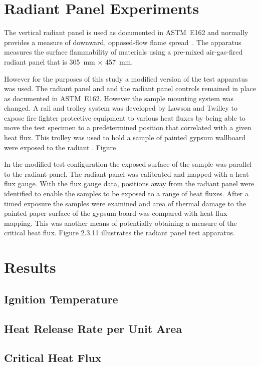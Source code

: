 \documentclass[twoside]{uocthesis}
\begin{document}
{{\section{Radiant Panel Experiments}

The vertical radiant panel is used as documented in ASTM~E162 and normally provides a measure of downward, opposed-flow flame spread~\cite{ASTM_E162}.  The apparatus measures the surface flammability of materials using a pre-mixed air-gas-fired radiant panel that is 305~mm × 457~mm.

However for the purposes of this study a modified version of the test apparatus was used.  The radiant panel and and the radiant panel controls remained in place as documented in ASTM~E162. However the sample mounting system was changed. A rail and trolley system was developed by Lawson and Twilley to expose fire fighter protective equipment to various heat fluxes by being able to move the test specimen to a predetermined position that correlated with a given heat flux.  This trolley was used to hold a sample of painted gypsum wallboard were exposed to the radiant .   Figure

In the modified test configuration the exposed surface of the sample was parallel to the radiant panel. The radiant panel was calibrated and mapped with a heat flux gauge. With the flux gauge data, positions away from the radiant panel were identified to enable the samples to be exposed to a range of heat fluxes.  After a timed exposure the samples were examined and area of thermal damage to the painted paper surface of the gypsum board was compared with heat flux mapping.  This was another means of potentially obtaining a measure of the critical heat flux. Figure 2.3.11 illustrates the radiant panel test apparatus.


\section{Results}

\subsection{Ignition Temperature}

\subsection{Heat Release Rate per Unit Area}

\subsection{Critical Heat Flux}


}}
\end{document}
